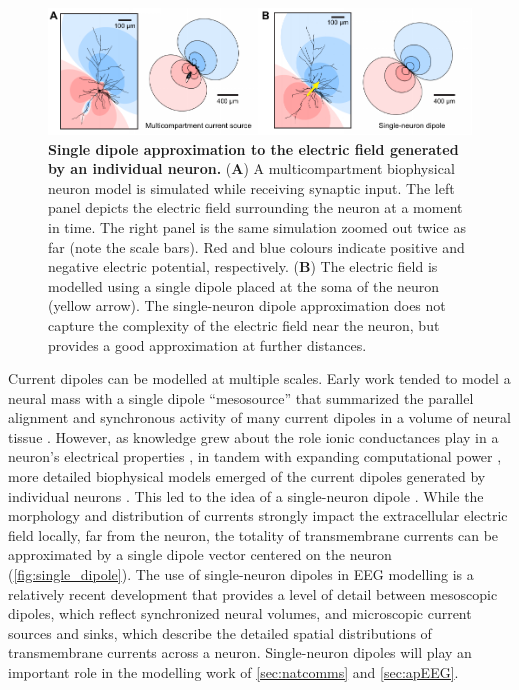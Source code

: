 \begin{figure}[b!]
    \centering
    \includegraphics[width=\textwidth]{Figures/chapter1/single_neuron_dipole.pdf}
    
    \caption{\textbf{Single dipole approximation to the electric field generated by an individual neuron.} 
    (\textbf{A}) A multicompartment biophysical neuron model is simulated while receiving synaptic input. The left panel depicts the electric field surrounding the neuron at a moment in time. The right panel is the same simulation zoomed out twice as far (note the scale bars). Red and blue colours indicate positive and negative electric potential, respectively. (\textbf{B}) The electric field is modelled using a single dipole placed at the soma of the neuron (yellow arrow). The single-neuron dipole approximation does not capture the complexity of the electric field near the neuron, but provides a good approximation at further distances.} 
    \label{fig:single_dipole}
\end{figure}

Current dipoles can be modelled at multiple scales. Early work tended to model a neural mass with a single dipole ``mesosource'' that summarized the parallel alignment and synchronous activity of many current dipoles in a volume of neural tissue \cite{Nunez2006}. However, as knowledge grew about the role ionic conductances play in a neuron's electrical properties \cite{Baxter1991}, in tandem with expanding computational power \cite{Beeman2013}, more detailed biophysical models emerged of the current dipoles generated by individual neurons \cite{Murakami2002, Murakami2003 ,Murakami2006, Jones2007}. This led to the idea of a single-neuron dipole \cite{Næss2021,Pettersen2012}. While the morphology and distribution of currents strongly impact the extracellular electric field locally, far from the neuron, the totality of transmembrane currents can be approximated by a single dipole vector centered on the neuron (\autoref{fig:single_dipole}). The use of single-neuron dipoles in EEG modelling is a relatively recent development that provides a level of detail between mesoscopic dipoles, which reflect synchronized neural volumes, and microscopic current sources and sinks, which describe the detailed spatial distributions of transmembrane currents across a neuron. Single-neuron dipoles will play an important role in the modelling work of \autoref{sec:natcomms} and \autoref{sec:apEEG}.


